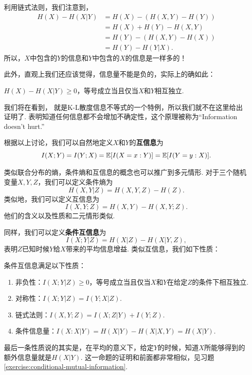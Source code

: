 利用链式法则，我们注意到，
\begin{align*}
    H(X)-H(X|Y)&=H(X)-(H(X,Y)-H(Y))\\
               &=H(X)+H(Y)-H(X,Y)\\
               &=H(Y)-(H(X,Y)-H(X))\\
               &=H(Y)-H(Y|X).
\end{align*}
所以，$X$中包含的$Y$的信息和$Y$中包含的$X$的信息是一样多的！

此外，直观上我们还应该觉得，信息量不能是负的，实际上的确如此：
\begin{proposition}\label{prop:information-doesnt-hurt}
    $H(X)-H(X|Y)\geq 0$，等号成立当且仅当$X$和$Y$相互独立.
\end{proposition}

我们将在看到， 就是K-L散度信息不等式的一个特例，所以我们就不在这里给出证明了.  表明知道任何信息都不会增加不确定性，这个原理被称为“Information doesn't hurt.”

根据以上讨论，我们可以自然地定义$X$和$Y$的\textbf{互信息}为
\[I(X;Y)=I(Y;X)=\mathbb{E}[I(X=x:Y)]=\mathbb{E}[I(Y=y:X)].\]

类似联合分布的熵，条件熵和互信息的概念也可以推广到多元情形. 对于三个随机变量$X,Y,Z$，我们可以定义条件熵为
\[H(X,Y|Z)=H(X,Y,Z)-H(Z).\]
类似地，我们可以定义互信息为
\[I(X,Y;Z)=H(X,Y)-H(X,Y;Z).\]
他们的含义以及性质和二元情形类似.

同样，我们可以定义\textbf{条件互信息}为
\[I(X;Y|Z)=H(X|Z)-H(X|Y,Z),\]
表明$Z$已知时候$Y$给$X$带来的平均信息增益. 类似互信息，我们如下性质：
\begin{proposition}\label{prop:conditional-mutual-information}
    条件互信息满足以下性质：
    \begin{enumerate}
        \item 非负性：$I(X;Y|Z)\geq 0$，等号成立当且仅当$X$和$Y$在给定$Z$的条件下相互独立.
        \item 对称性：$I(X;Y|Z)=I(Y;X|Z)$.
        \item 链式法则：$I(X,Y;Z)=I(X;Z|Y)+I(Y;Z)$.
        \item 条件信息量：$I(X:X|Y)=H(X|Y)-H(X|X,Y)=H(X|Y)$.
    \end{enumerate}
\end{proposition}
最后一条性质说的其实是，在平均的意义下，给定$Y$的时候，知道$X$所能够得到的额外信息量就是$H(X|Y)$. 这一命题的证明和前面都非常相似，见习题 \ref{exercise:conditional-mutual-information}. 

